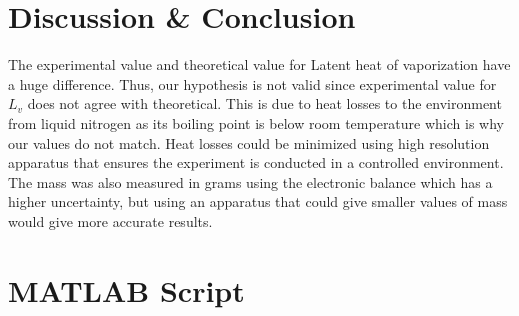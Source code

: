 \section{Discussion \& Conclusion}
The experimental value and theoretical value for Latent heat of vaporization have a huge difference. Thus, our hypothesis is not valid since experimental value for $L_v$ does not agree with theoretical. This is due to heat losses to the environment from liquid nitrogen as its boiling point is below room temperature which is why our values do not match. Heat losses could be minimized using high resolution apparatus that ensures the experiment is conducted in a controlled environment. The mass was also measured in grams using the electronic balance which has a higher uncertainty, but using an apparatus that could give smaller values of mass would give more accurate results. 

\section{MATLAB Script}


% 



